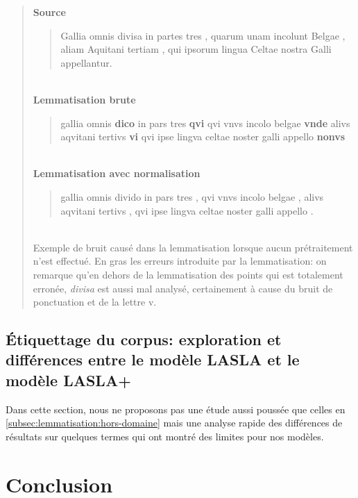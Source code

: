 \begin{quote}
    \textbf{Source}\\
    \blockquote{Gallia omnis divisa in partes tres , quarum unam incolunt Belgae , aliam Aquitani tertiam , qui ipsorum lingua Celtae nostra Galli appellantur.}\\
    \textbf{Lemmatisation brute}\\
    \blockquote{gallia omnis \textbf{dico} in pars tres \textbf{qvi} qvi vnvs incolo belgae \textbf{vnde} alivs aqvitani tertivs \textbf{vi} qvi ipse lingva celtae noster galli appello \textbf{nonvs}}\\
    \textbf{Lemmatisation avec normalisation}\\
    \blockquote{gallia omnis divido in pars tres , qvi vnvs incolo belgae , alivs aqvitani tertivs , qvi ipse lingva celtae noster galli appello .}\\
    
    Exemple de bruit causé dans la lemmatisation lorsque aucun prétraitement n'est effectué. En gras les erreurs introduite par la lemmatisation: on remarque qu'en dehors de la lemmatisation des points qui est totalement erronée, \textit{divisa} est aussi mal analysé, certainement à cause du bruit de ponctuation et de la lettre v.
    \label{quote:lemmatisation:gallia-errors}
\end{quote}


\subsection{Étiquettage du corpus: exploration et différences entre le modèle LASLA et le modèle LASLA+}
 
Dans cette section, nous ne proposons pas une étude aussi poussée que celles en \ref{subsec:lemmatisation:hors-domaine} mais une analyse rapide des différences de résultats sur quelques termes qui ont montré des limites pour nos modèles.

\section{Conclusion}

